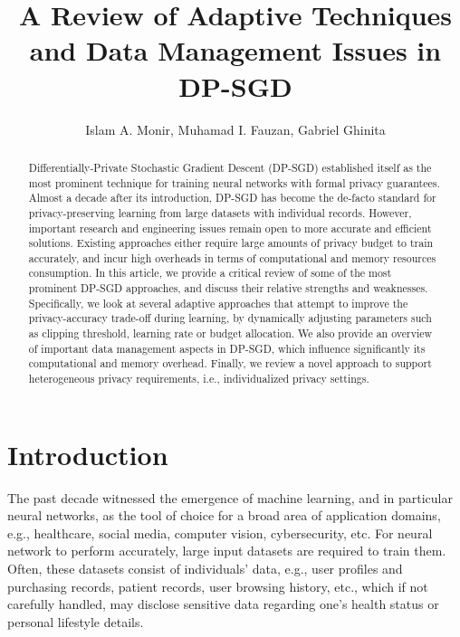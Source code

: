 \documentclass[11pt]{article}
\begin{document}
\title{A Review of Adaptive Techniques and Data Management Issues in DP-SGD}
\author{Islam A. Monir, Muhamad I. Fauzan, Gabriel Ghinita}

\date{}

\maketitle

\begin{abstract}
Differentially-Private Stochastic Gradient Descent (DP-SGD) established itself as the most prominent technique for training neural networks with formal privacy guarantees. Almost a decade after its introduction, DP-SGD has become the de-facto standard for privacy-preserving learning from large datasets with individual records. However, important research and engineering issues remain open to more accurate and efficient solutions. Existing approaches either require large amounts of privacy budget to train accurately, and incur high overheads in terms of computational and memory resources consumption. In this article, we provide a critical review of some of the most prominent DP-SGD approaches, and discuss their relative strengths and weaknesses. Specifically, we look at several adaptive approaches that attempt to improve the privacy-accuracy trade-off during learning, by dynamically adjusting parameters such as clipping threshold, learning rate or budget allocation. We also provide an overview of important data management aspects in DP-SGD, which influence significantly its computational and memory overhead. Finally, we review a novel approach to support heterogeneous privacy requirements, i.e., individualized privacy settings.
\end{abstract}

\section{Introduction}

The past decade witnessed the emergence of machine learning, and in particular neural networks, as the tool of choice for a broad area of application domains, e.g., healthcare, social media, computer vision, cybersecurity, etc. For neural network to perform accurately, large input datasets are required to train them. Often, these datasets consist of individuals' data, e.g., user profiles and purchasing records, patient records, user browsing history, etc., which if not carefully handled, may disclose sensitive data regarding one's health status or personal lifestyle details.
\end{document}

